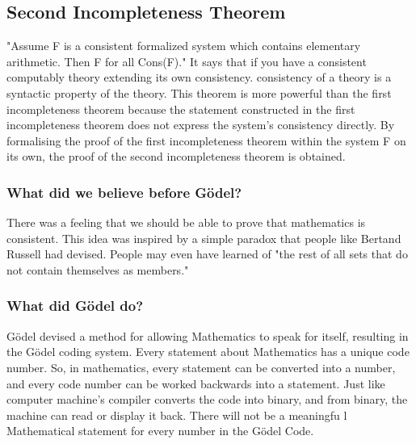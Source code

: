 \documentclass[13pt,letterpaper]{article}
\begin{document}
\subsection* {Second Incompleteness Theorem} "Assume F is a consistent formalized system which contains elementary arithmetic. Then F for all Cons(F)."
It says that if you have a consistent computably theory extending its own consistency. consistency of a theory is a syntactic property of the theory.
This theorem is more powerful than the first incompleteness theorem because the statement constructed in the first incompleteness theorem does not express the system's consistency directly. By formalising the proof of the first incompleteness theorem within the system F on its own, the proof of the second incompleteness theorem is obtained.
\subsubsection* {What did we believe before Gödel?} 
There was a feeling that we should be able to prove that mathematics is consistent. This idea was inspired by a simple paradox that people like Bertand Russell had devised. People may even have learned of "the rest of all sets that do not contain themselves as members."
\subsubsection* {What did Gödel do?}
Gödel devised a method for allowing Mathematics to speak for itself, resulting in the Gödel coding system. Every statement about Mathematics has a unique code number. So, in mathematics, every statement can be converted into a number, and every code number can be worked backwards into a statement. Just like 
computer machine's compiler converts the code into binary, and from binary, the machine can read or display it back.
There will not be a meaningfu l Mathematical statement for every number in the Gödel Code.
\end{document}
